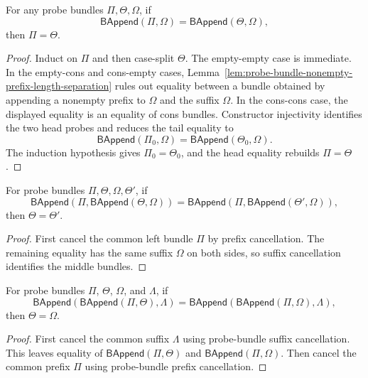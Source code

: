 \begin{theorem}
\label{thm:probe-bundle-suffix-cancellation}
For any probe bundles $\Pi,\Theta,\Omega$, if
$$
\mathsf{BAppend}(\Pi,\Omega)=\mathsf{BAppend}(\Theta,\Omega),
$$
then $\Pi=\Theta$.
\end{theorem}
\begin{proof}
Induct on $\Pi$ and then case-split $\Theta$. The empty-empty case is immediate. In the empty-cons and cons-empty cases, Lemma~\ref{lem:probe-bundle-nonempty-prefix-length-separation} rules out equality between a bundle obtained by appending a nonempty prefix to $\Omega$ and the suffix $\Omega$. In the cons-cons case, the displayed equality is an equality of cons bundles. Constructor injectivity identifies the two head probes and reduces the tail equality to
$$
\mathsf{BAppend}(\Pi_0,\Omega)=\mathsf{BAppend}(\Theta_0,\Omega).
$$
The induction hypothesis gives $\Pi_0=\Theta_0$, and the head equality rebuilds $\Pi=\Theta$.
\end{proof}

\begin{theorem}
\label{thm:bundle-append-common-context-cancel}
For probe bundles $\Pi,\Theta,\Omega,\Theta'$, if
$$
\mathsf{BAppend}(\Pi,\mathsf{BAppend}(\Theta,\Omega))
=\mathsf{BAppend}(\Pi,\mathsf{BAppend}(\Theta',\Omega)),
$$
then $\Theta=\Theta'$.
\end{theorem}
\begin{proof}
First cancel the common left bundle $\Pi$ by prefix cancellation. The remaining
equality has the same suffix $\Omega$ on both sides, so suffix cancellation
identifies the middle bundles.
\end{proof}

\begin{theorem}
\label{thm:probe-bundle-append-middle-cancel}
For probe bundles $\Pi$, $\Theta$, $\Omega$, and $\Lambda$, if
$$
\mathsf{BAppend}(\mathsf{BAppend}(\Pi,\Theta),\Lambda)
=
\mathsf{BAppend}(\mathsf{BAppend}(\Pi,\Omega),\Lambda),
$$
then $\Theta=\Omega$.
\end{theorem}
\begin{proof}
First cancel the common suffix $\Lambda$ using probe-bundle suffix
cancellation. This leaves equality of $\mathsf{BAppend}(\Pi,\Theta)$ and
$\mathsf{BAppend}(\Pi,\Omega)$. Then cancel the common prefix $\Pi$ using
probe-bundle prefix cancellation.
\end{proof}

